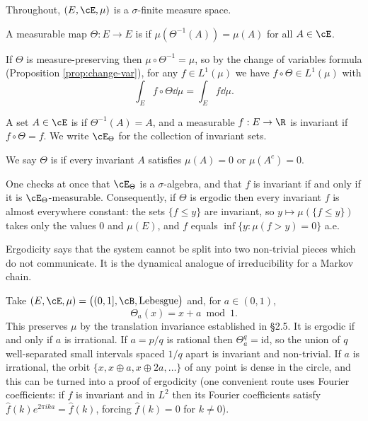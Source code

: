 Throughout, $(E,\cE,\mu)$ is a $\sigma$-finite measure space.

\begin{definition}
	A measurable map $\Theta : E \to E$ is  if $\mu(\Theta^{-1}(A))=\mu(A)$ for all $A \in \cE$.
\end{definition}

If $\Theta$ is measure-preserving then $\mu\circ\Theta^{-1}=\mu$, so by the change of variables formula (Proposition \ref{prop:change-var}), for any $f \in L^1(\mu)$ we have $f \circ \Theta \in L^1(\mu)$ with
$$
\int_E f\circ\Theta\dd\mu = \int_E f\dd\mu.
$$

\begin{definition}
	A set $A \in \cE$ is  if $\Theta^{-1}(A)=A$, and a measurable $f : E \to \R$ is invariant if $f\circ\Theta = f$. We write $\cE_\Theta$ for the collection of invariant sets.

	We say $\Theta$ is  if every invariant $A$ satisfies $\mu(A)=0$ or $\mu(A^c)=0$.
\end{definition}

One checks at once that $\cE_\Theta$ is a $\sigma$-algebra, and that $f$ is invariant if and only if it is $\cE_\Theta$-measurable. Consequently, if $\Theta$ is ergodic then every invariant $f$ is almost everywhere constant: the sets $\{f \leq y\}$ are invariant, so $y \mapsto \mu(\{f\leq y\})$ takes only the values $0$ and $\mu(E)$, and $f$ equals $\inf\{y : \mu(f>y)=0\}$ a.e.

Ergodicity says that the system cannot be split into two non-trivial pieces which do not communicate. It is the dynamical analogue of irreducibility for a Markov chain.

\begin{example}\label{ex:rotation}
	Take $(E,\cE,\mu)=\big((0,1],\cB,\text{Lebesgue}\big)$ and, for $a \in (0,1)$,
	$$
	\Theta_a(x) = x + a \bmod 1.
	$$
	This preserves $\mu$ by the translation invariance established in \S2.5. It is ergodic if and only if $a$ is irrational. If $a = p/q$ is rational then $\Theta_a^q = \mathrm{id}$, so the union of $q$ well-separated small intervals spaced $1/q$ apart is invariant and non-trivial. If $a$ is irrational, the orbit $\{x, x\oplus a, x\oplus 2a,\dots\}$ of any point is dense in the circle, and this can be turned into a proof of ergodicity (one convenient route uses Fourier coefficients: if $f$ is invariant and in $L^2$ then its Fourier coefficients satisfy $\hat f(k)e^{2\pi i k a}=\hat f(k)$, forcing $\hat f(k)=0$ for $k \neq 0$).
\end{example}

